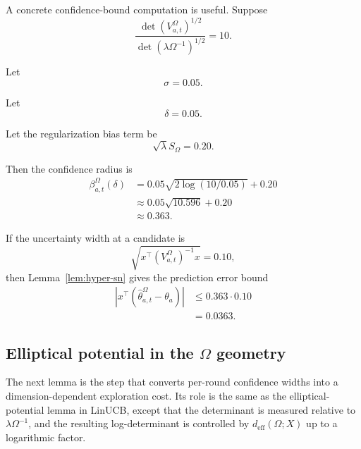 \documentclass{article} %
\begin{document}
A concrete confidence-bound computation is useful.  Suppose
\begin{equation}
\label{eq:hyper-bound-example-det-ratio}
\frac{
\det(V_{a,t}^{\Omega})^{1/2}
}{
\det(\lambda\Omega^{-1})^{1/2}
}
=
10 .
\end{equation}

Let
\begin{equation}
\label{eq:hyper-bound-example-sigma}
\sigma=0.05 .
\end{equation}

Let
\begin{equation}
\label{eq:hyper-bound-example-delta}
\delta=0.05 .
\end{equation}

Let the regularization bias term be
\begin{equation}
\label{eq:hyper-bound-example-bias}
\sqrt{\lambda}S_{\Omega}=0.20 .
\end{equation}

Then the confidence radius is
\begin{align}
\label{eq:hyper-bound-example-beta}
\beta_{a,t}^{\Omega}(\delta)
&=
0.05
\sqrt{
2\log(10/0.05)
}
+
0.20
\\
&\approx
0.05\sqrt{10.596}+0.20
\\
&\approx
0.363 .
\end{align}

If the uncertainty width at a candidate is
\begin{equation}
\label{eq:hyper-bound-example-width}
\sqrt{x^\top(V_{a,t}^{\Omega})^{-1}x}=0.10,
\end{equation}
then Lemma~\ref{lem:hyper-sn} gives the prediction error bound
\begin{align}
\label{eq:hyper-bound-example-pred}
\left|
x^\top
\left(
\widehat{\theta}_{a,t}^{\Omega}-\theta_a
\right)
\right|
&\le
0.363\cdot 0.10
\\
&=
0.0363 .
\end{align}

\subsection{Elliptical potential in the \(\Omega\) geometry}

The next lemma is the step that converts per-round confidence widths into a dimension-dependent exploration cost.  Its role is the same as the elliptical-potential lemma in LinUCB, except that the determinant is measured relative to \(\lambda\Omega^{-1}\), and the resulting log-determinant is controlled by \(d_{\mathrm{eff}}(\Omega;X)\) up to a logarithmic factor.
\end{document}
